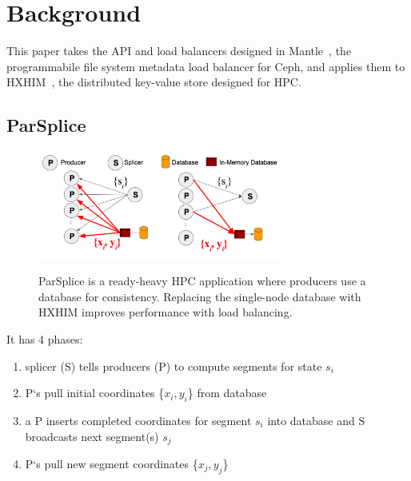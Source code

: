 \section{Background}

This paper takes the API and load balancers designed in
Mantle~\cite{sevilla:sc15-mantle}, the programmabile file system metadata load
balancer for Ceph, and applies them to
HXHIM~\cite{greenberg:hotstorage2015-mdhim}, the distributed key-value store
designed for HPC.

\subsection{ParSplice}
\label{sec:parsplice}

\begin{figure}[t]
  \noindent\includegraphics[width=19pc,angle=0]{figures/arch-parsplice.png}\\
  \caption{ParSplice is a ready-heavy HPC application where producers use a
  database for consistency. Replacing the single-node database with HXHIM
  improves performance with load balancing.
  \label{fig:arch-parsplice}}
\end{figure}

It has 4 phases:

\begin{enumerate}

  \item splicer (S) tells producers (P) to compute segments for state \(s_i\)

  \item P`s pull initial coordinates \{\(x_i, y_i\)\} from database

  \item a P inserts completed coordinates for segment \(s_i\) into database and
  S broadcasts next segment(s) \(s_j\) 

  \item P`s pull new segment coordinates \{\(x_j, y_j\)\}
\end{enumerate}



